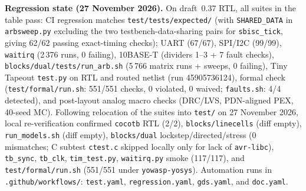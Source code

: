 \documentclass[10pt,a4paper]{article}
\begin{document}
\textbf{Regression state (27 November 2026).} On draft~0.37 RTL, all suites in the table pass: CI regression matches
\texttt{test/tests/expected/} (with \texttt{SHARED\_DATA} in \texttt{arbsweep.py} excluding the two testbench-data-sharing
pairs for \texttt{sbisc\_tick}, giving 62/62 passing exact-timing checks); UART (67/67), SPI/I2C (99/99), \texttt{waitirq}
(2\,376 runs, 0 failing), 10BASE-T (dividers 1--3 + 7 fault checks), \texttt{blocks/dual/tests/run\_arb.sh} (5\,766 matrix
runs + sweeps, 0 failing), Tiny Tapeout \texttt{test.py} on RTL and routed netlist (run 45905736124), formal check
(\texttt{test/formal/run.sh}: 551/551 checks, 0 violated, 0 waived; \texttt{faults.sh}: 4/4 detected), and post-layout
analog macro checks (DRC/LVS, PDN-aligned PEX, 40-seed MC). Following relocation of the suites into \texttt{test/} on
27 November 2026, local re-verification confirmed \texttt{cocotb} RTL (2/2), \texttt{blocks/linecells} (diff empty),
\texttt{run\_models.sh} (diff empty), \texttt{blocks/dual} lockstep/directed/stress (0 mismatches; C subtest
\texttt{ctest.c} skipped locally only for lack of \texttt{avr-libc}), \texttt{tb\_sync}, \texttt{tb\_clk},
\texttt{tim\_test.py}, \texttt{waitirq.py} smoke (117/117), and \texttt{test/formal/run.sh} (551/551 under \texttt{yowasp-yosys}).
Automation runs in \texttt{.github/workflows/}: \texttt{test.yaml}, \texttt{regression.yaml}, \texttt{gds.yaml}, and \texttt{doc.yaml}.
\end{document}
